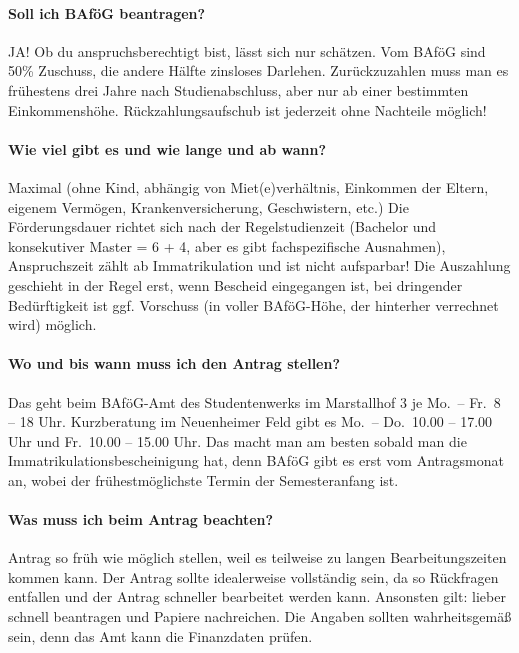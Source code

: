 
\paragraph{Soll ich BAföG beantragen?}
JA! Ob du anspruchsberechtigt bist, lässt sich nur schätzen. Vom BAföG sind 50\% Zuschuss, die andere Hälfte zinsloses Darlehen. Zurückzuzahlen muss man es frühestens drei Jahre nach Studienabschluss, aber nur ab einer bestimmten Einkommenshöhe. Rückzahlungsaufschub ist jederzeit ohne Nachteile möglich!

\paragraph{Wie viel gibt es und wie lange und ab wann?}
Maximal  (ohne Kind, abhängig von Miet(e)verhältnis, Einkommen der Eltern, eigenem Vermögen, Krankenversicherung, Geschwistern, etc.) Die Förderungsdauer richtet sich nach der Regelstudienzeit (Bachelor und konsekutiver Master = 6 + 4, aber es gibt fachspezifische Ausnahmen), Anspruchszeit zählt ab Immatrikulation und ist nicht aufsparbar! Die Auszahlung geschieht in der Regel erst, wenn Bescheid eingegangen ist, bei dringender Bedürftigkeit ist ggf. Vorschuss (in voller BAföG-Höhe, der hinterher verrechnet wird) möglich.

\paragraph{Wo und bis wann muss ich den Antrag stellen?}
Das geht beim BAföG-Amt des Studentenwerks im Marstallhof 3 je Mo.\ -- Fr.\ 8 – 18 Uhr. Kurzberatung im Neuenheimer Feld gibt es Mo.\ – Do.\ 10.00 -- 17.00 Uhr und Fr.\ 10.00 -- 15.00 Uhr. Das macht man am besten sobald man die Immatrikulationsbescheinigung hat, denn BAföG gibt es erst vom Antragsmonat an, wobei der frühestmöglichste Termin der Semesteranfang ist.

\paragraph{Was muss ich beim Antrag beachten?}
Antrag so früh wie möglich stellen, weil es teilweise zu langen Bearbeitungszeiten kommen kann. Der Antrag sollte idealerweise vollständig sein, da so Rückfragen entfallen und der Antrag schneller bearbeitet werden kann. Ansonsten gilt: lieber schnell beantragen und Papiere nachreichen. Die Angaben sollten wahrheitsgemäß sein, denn das Amt kann die Finanzdaten prüfen.


